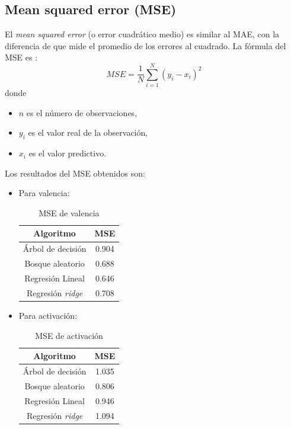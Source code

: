 \documentclass[12pt,a4paper,Spanish]{article}
\begin{document}
\subsection{Mean squared error (MSE)}
El \textit{mean squared error} (o error cuadrático medio) es similar al MAE, con la diferencia de que mide el promedio de los errores al cuadrado. La fórmula del MSE es \cite{eswiki:159951880}:
\begin{equation}
	MSE = \frac{1}{N} \sum_{i=1}^{N} (y_i - x_i)^{2}
\end{equation}
donde
\begin{itemize}
	\item $n$ es el número de observaciones,
	\item $y_i$ es el valor real de la observación,
	\item $x_i$ es el valor predictivo.
\end{itemize}

Los resultados del MSE obtenidos son:
\begin{itemize}
	\item Para valencia:
	\begin{table}[H]
		\centering
		\caption{MSE de valencia}
		\label{tab:msevalencia}
		\begin{tabular}{|c|c|}
			\hline
			\textbf{Algoritmo} & \textbf{MSE} \\
			\hline
			Árbol de decisión & 0.904 \\
			Bosque aleatorio & 0.688 \\
			Regresión Lineal & 0.646 \\
			Regresión \textit{ridge} & 0.708 \\
			\hline
		\end{tabular}
	\end{table}
	\item Para activación:
	\begin{table}[H]
		\centering
		\caption{MSE de activación}
		\label{tab:mseactivacion}
		\begin{tabular}{|c|c|}
			\hline
			\textbf{Algoritmo} & \textbf{MSE} \\
			\hline
			Árbol de decisión & 1.035 \\
			Bosque aleatorio & 0.806 \\
			Regresión Lineal & 0.946 \\
			Regresión \textit{ridge} & 1.094 \\
			\hline
		\end{tabular}
	\end{table}
\end{itemize}
\end{document}
